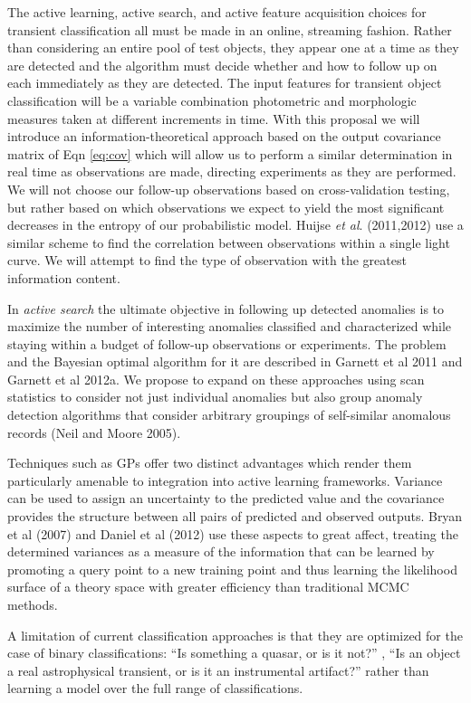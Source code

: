 \documentclass[prd,nofootbib,floatfix,11pt,tightenlines]{revtex4}
\begin{document}
The active learning, active search, and active feature
acquisition choices for transient classification
all must be made in an online, streaming fashion.  
Rather than
considering an entire pool of test objects, they appear one at a time as
they are detected and the algorithm must decide whether and how to follow
up on each immediately as they are detected. 
The input features for transient object classification will be 
a variable combination photometric
and morphologic measures taken at different increments in time. With
this proposal we will  introduce an information-theoretical approach 
based on the output covariance matrix of Eqn \ref{eq:cov} which will allow
us to perform a similar determination in real time as observations are made,
directing experiments as they are performed.
We will not choose our follow-up observations based on cross-validation testing,
but rather based on which observations we expect to yield the most significant
decreases in the entropy of our probabilistic model.
Huijse {\it et al}. (2011,2012) use a similar scheme to find the correlation
between observations within a single light curve.  We will attempt to find
the type of observation with the greatest information content. 

In {\it active search} the ultimate objective in following up detected
anomalies is to maximize the number of interesting anomalies
classified and characterized while staying within a budget of
follow-up observations or experiments. The problem and the Bayesian
optimal algorithm for it are described in Garnett et al 2011 and Garnett
et al 2012a. We propose to expand on these approaches using scan
statistics to consider not just individual anomalies but also group
anomaly detection algorithms that consider arbitrary groupings of
self-similar anomalous records (Neil and Moore 2005).


Techniques such as GPs offer
two distinct advantages which render them particularly amenable to
integration into active learning frameworks.  Variance can be used
to assign an uncertainty to the predicted value and the covariance
provides the structure between all pairs of predicted and observed
outputs.  Bryan {et al} (2007) and Daniel {et al} (2012) use these
aspects to great affect, treating the determined variances as a
measure of the information that can be learned by promoting a query
point to a new training point and thus learning the likelihood surface
of a theory space with greater efficiency than traditional MCMC
methods.


A limitation of current classification approaches is that they are 
optimized for the case of binary classifications: ``Is something a 
quasar, or is it not?''  \cite{kim2011,pichara2012}, ``Is an 
object a real astrophysical transient, or is it an instrumental 
artifact?''  \cite{brink2012} rather than learning a model over the 
full range of classifications. 
\end{document}
